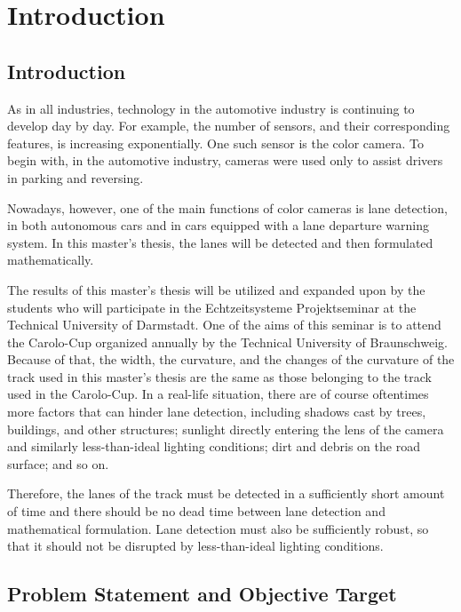 
\chapter{Introduction}\label{cha:Intro}

\section{Introduction}\label{sec:Introduction}

As in all industries, technology in the automotive industry is continuing to develop day by day. For example, the number of sensors, and their corresponding features, is increasing exponentially. One such sensor is the color camera. To begin with, in the automotive industry, cameras were used only to assist drivers in parking and reversing.
 
Nowadays, however, one of the main functions of color cameras is lane detection, in both autonomous cars and in cars equipped with a lane departure warning system. In this master's thesis, the lanes will be detected and then formulated mathematically.

The results of this master's thesis will be utilized and expanded upon by the students who will participate in the Echtzeitsysteme Projektseminar at the Technical University of Darmstadt. One of the aims of this seminar is to attend the Carolo-Cup organized annually by the Technical University of Braunschweig. Because of that, the width, the curvature, and the changes of the curvature of the track used in this master's thesis are the same as those belonging to the track used in the Carolo-Cup. In a real-life situation, there are of course oftentimes more factors that can hinder lane detection, including shadows cast by trees, buildings, and other structures; sunlight directly entering the lens of the camera and similarly less-than-ideal lighting conditions; dirt and debris on the road surface; and so on.

Therefore, the lanes of the track must be detected in a sufficiently short amount of time and there should be no dead time between lane detection and mathematical 
formulation. Lane detection must also be sufficiently robust, so that it should not be disrupted by less-than-ideal lighting conditions.

\section{Problem Statement and Objective Target}\label{sec:Problem Statement and Objective Target}


